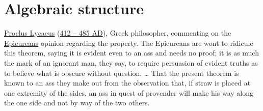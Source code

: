 


\section{Algebraic structure}
\label{sec:d_def}
\qboxns
  {
    \href{http://en.wikipedia.org/wiki/Proclus}{Proclus Lycaeus}
    (\href{http://www-history.mcs.st-andrews.ac.uk/Timelines/TimelineA.html}{412 -- 485 AD}),
    Greek philosopher,
    commenting on the 
    \href{http://en.wikipedia.org/wiki/Epicureans}{Epicureans} 
    opinion regarding the  property.
    \footnotemark
  }
  {
   The Epicureans are wont to ridicule this theorem, 
   saying it is evident even to an ass and needs no proof;
   it is as much the mark of an ignorant man,
   they say, to require persuasion of evident truths as to believe
   what is obscure without question.
   \ldots
   That the present theorem is known to an ass they make out from the
   observation that, if straw is placed at one extremity of the sides,
   an ass in quest of provender will make his way along the one side
   and not by way of the two others.
  }


